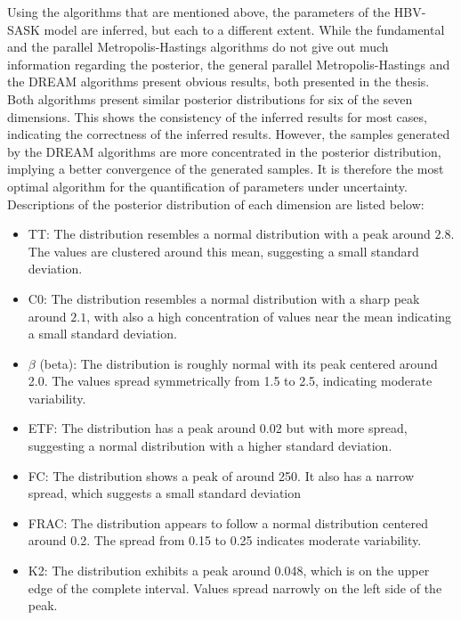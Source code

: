 Using the algorithms that are mentioned above, the parameters of the HBV-SASK model are inferred, but each to a different extent. While the fundamental and the parallel Metropolis-Hastings algorithms do not give out much information regarding the posterior, the general parallel Metropolis-Hastings and the DREAM algorithms present obvious results, both presented in the thesis. Both algorithms present similar posterior distributions for six of the seven dimensions. This shows the consistency of the inferred results for most cases, indicating the correctness of the inferred results. However, the samples generated by the DREAM algorithms are more concentrated in the posterior distribution, implying a better convergence of the generated samples. It is therefore the most optimal algorithm for the quantification of parameters under uncertainty. Descriptions of the posterior distribution of each dimension are listed below:
\begin{itemize}
    \item TT: The distribution resembles a normal distribution with a peak around $2.8$. The values are clustered around this mean, suggesting a small standard deviation.
    \item C0: The distribution resembles a normal distribution with a sharp peak around $2.1$, with also a high concentration of values near the mean indicating a small standard deviation.
    \item $\beta$ (beta): The distribution is roughly normal with its peak centered around 2.0. The values spread symmetrically from 1.5 to 2.5, indicating moderate variability.
    \item ETF: The distribution has a peak around 0.02 but with more spread, suggesting a normal distribution with a higher standard deviation.
    \item FC: The distribution shows a peak of around 250. It also has a narrow spread, which suggests a small standard deviation
    \item FRAC: The distribution appears to follow a normal distribution centered around 0.2. The spread from 0.15 to 0.25 indicates moderate variability.
    \item K2: The distribution exhibits a peak around 0.048, which is on the upper edge of the complete interval. Values spread narrowly on the left side of the peak.
\end{itemize}


